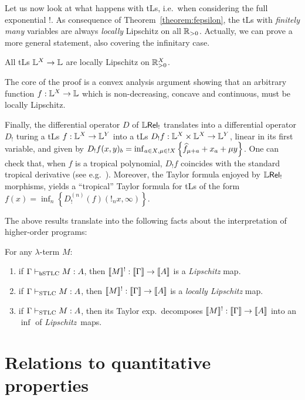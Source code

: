 \documentclass[submission,%
]{eptcs}
\begin{document}
Let us now look at what happens with tLs, i.e.~when considering the full exponential $!$.
As consequence of Theorem~\ref{theorem:fepsilon}, the tLs with \emph{finitely many} variables are always \emph{locally} Lipschitz on all $\mathbb{R}_{>0}$.
Actually, we can prove a more general statement, also covering the infinitary case.


\begin{theorem}\label{thmTLSlocLip}
 All tLs $\mathbb{L}^X\to\mathbb{L}$ are locally Lipschitz on $\mathbb{R}_{>0}^X$.
\end{theorem}
The core of the proof is a convex analysis argument showing that an arbitrary function $f:\mathbb{L}^X\to\mathbb{L}$ which is non-decreasing, concave and continuous, must be locally Lipschitz. 

Finally, the differential operator $D$ of $\mathbb{L} \mathsf{Rel}_{!}$ translates into a differential operator $D_{!}$ turing a tLs $f:\mathbb{L}^{X}\to \mathbb{L}^{Y}$ into a tLs $D_{!}f:\mathbb{L}^{X}\times \mathbb{L}^{X}\to \mathbb{L}^{Y}$, linear in its first variable, and given by $D_{!}f(x,y)_{b}=\inf_{a\in X, \mu\in !X}\left\{\widehat{f}_{\mu+a}+x_{a}+\mu y\right\}$.
One can check that, when $f$ is a tropical polynomial, $D_{!}f$ coincides with the standard tropical derivative (see e.g.~\cite{Grigoriev2017}).
Moreover, the Taylor formula enjoyed by $\mathbb{L} \mathsf{Rel}_!$ morphisms, yields a ``tropical'' Taylor formula for tLs of the form $f(x)=\inf_{n}\left\{D_{!}^{(n)}(f)(!_{n}x,\infty)\right\}$.


The above results translate into the following facts about the interpretation of higher-order programs:
\begin{corollary}\label{cor:main}
For any $\lambda$-term $M$:
\begin{enumerate}
\item if $\Gamma \vdash_{\mathsf b\mathrm{STLC}} M:A$, then $\llbracket M\rrbracket^!:\llbracket\Gamma\rrbracket \to \llbracket A\rrbracket$ is a \emph{Lipschitz} map.
\item if $\Gamma \vdash_{\mathrm{STLC}}M:A$, then $\llbracket M\rrbracket^!: \llbracket\Gamma\rrbracket \to \llbracket A\rrbracket$ is a \emph{locally Lipschitz} map.
\item  if $\Gamma \vdash_{\mathrm{STLC}}M:A$, then its Taylor exp.\ decomposes $\llbracket M\rrbracket^!: \llbracket\Gamma\rrbracket \to \llbracket A\rrbracket$ into an $\inf$ of \emph{Lipschitz}~maps.
\end{enumerate}
\end{corollary}


\section{Relations to quantitative properties}
\end{document}
